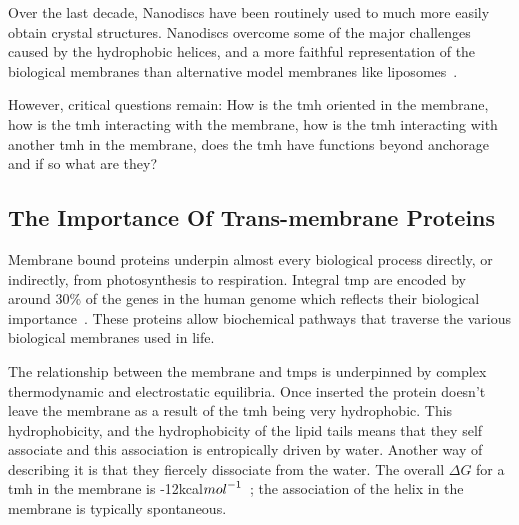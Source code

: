 
 Over the last decade, Nanodiscs have been routinely used to much more easily obtain crystal structures. Nanodiscs overcome some of the major challenges caused by the hydrophobic helices, and a more faithful representation of the biological membranes than alternative model membranes like liposomes~\cite{Borch2009}.

 However, critical questions remain: How is the \gls{tmh} oriented in the membrane, how is the \gls{tmh} interacting with the membrane, how is the \gls{tmh} interacting with another \gls{tmh} in the membrane, does the \gls{tmh} have functions beyond anchorage and if so what are they?




\subsection{The Importance Of Trans-membrane Proteins}
Membrane bound proteins underpin almost every biological process directly, or indirectly, from photosynthesis to respiration. Integral \gls{tmp} are encoded by around 30\% of the genes in the human genome which reflects their biological importance~\cite{Almen2009}. These proteins allow biochemical pathways that traverse the various biological membranes used in life. %

The relationship between the membrane and \gls{tmp}s is underpinned by complex thermodynamic and electrostatic equilibria. Once inserted the protein doesn't leave the membrane as a result of the \gls{tmh} being very hydrophobic. This hydrophobicity, and the hydrophobicity of the lipid tails means that they self associate and this association is entropically driven by water. Another way of describing it is that they fiercely dissociate from the water. The overall $\Delta G$ for a \gls{tmh} in the membrane is -12kcal${mol}^{\--1}$~\cite{Cymer2014}; the association of the helix in the membrane is typically spontaneous.


